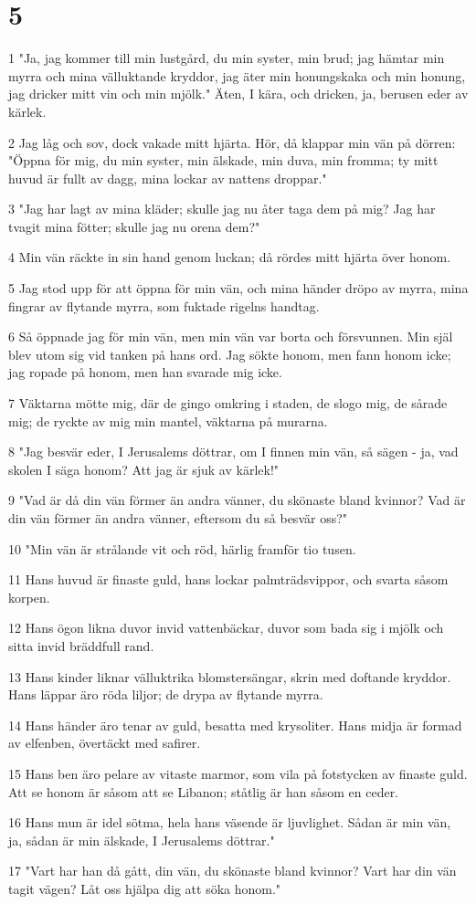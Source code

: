 \chapter{5}

\par 1 "Ja, jag kommer till min lustgård, du min syster, min brud; jag hämtar min myrra och mina välluktande kryddor, jag äter min honungskaka och min honung, jag dricker mitt vin och min mjölk." Äten, I kära, och dricken, ja, berusen eder av kärlek.
\par 2 Jag låg och sov, dock vakade mitt hjärta. Hör, då klappar min vän på dörren: "Öppna för mig, du min syster, min älskade, min duva, min fromma; ty mitt huvud är fullt av dagg, mina lockar av nattens droppar."
\par 3 "Jag har lagt av mina kläder; skulle jag nu åter taga dem på mig? Jag har tvagit mina fötter; skulle jag nu orena dem?"
\par 4 Min vän räckte in sin hand genom luckan; då rördes mitt hjärta över honom.
\par 5 Jag stod upp för att öppna för min vän, och mina händer dröpo av myrra, mina fingrar av flytande myrra, som fuktade rigelns handtag.
\par 6 Så öppnade jag för min vän, men min vän var borta och försvunnen. Min själ blev utom sig vid tanken på hans ord. Jag sökte honom, men fann honom icke; jag ropade på honom, men han svarade mig icke.
\par 7 Väktarna mötte mig, där de gingo omkring i staden, de slogo mig, de sårade mig; de ryckte av mig min mantel, väktarna på murarna.
\par 8 "Jag besvär eder, I Jerusalems döttrar, om I finnen min vän, så sägen - ja, vad skolen I säga honom? Att jag är sjuk av kärlek!"
\par 9 "Vad är då din vän förmer än andra vänner, du skönaste bland kvinnor? Vad är din vän förmer än andra vänner, eftersom du så besvär oss?"
\par 10 "Min vän är strålande vit och röd, härlig framför tio tusen.
\par 11 Hans huvud är finaste guld, hans lockar palmträdsvippor, och svarta såsom korpen.
\par 12 Hans ögon likna duvor invid vattenbäckar, duvor som bada sig i mjölk och sitta invid bräddfull rand.
\par 13 Hans kinder liknar välluktrika blomstersängar, skrin med doftande kryddor. Hans läppar äro röda liljor; de drypa av flytande myrra.
\par 14 Hans händer äro tenar av guld, besatta med krysoliter. Hans midja är formad av elfenben, övertäckt med safirer.
\par 15 Hans ben äro pelare av vitaste marmor, som vila på fotstycken av finaste guld. Att se honom är såsom att se Libanon; ståtlig är han såsom en ceder.
\par 16 Hans mun är idel sötma, hela hans väsende är ljuvlighet. Sådan är min vän, ja, sådan är min älskade, I Jerusalems döttrar."
\par 17 "Vart har han då gått, din vän, du skönaste bland kvinnor? Vart har din vän tagit vägen? Låt oss hjälpa dig att söka honom."

